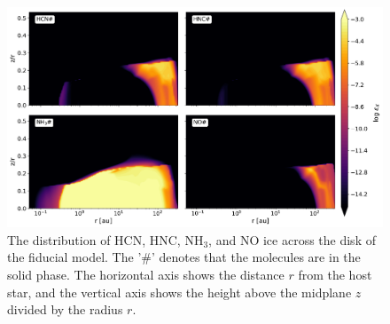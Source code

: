 \documentclass[oneside, single, authoryear, semicolon, 12pt]{lion-msc}
\newcommand{\4}{$_4$}
\newcommand{\3}{$_3$}
\newcommand{\2}{$_2$}
\begin{document}
\begin{figure}
    \centering
    \includegraphics[width=\linewidth]{Figures/Abundance2ice.pdf}
    \caption{The distribution of HCN, HNC, NH\3, and NO ice across the disk of the fiducial model. The '#' denotes that the molecules are in the solid phase. The horizontal axis shows the distance $r$ from the host star, and the vertical axis shows the height above the midplane $z$ divided by the radius $r$.}
    \label{fig:enter-label}
\end{figure}
\end{document}
